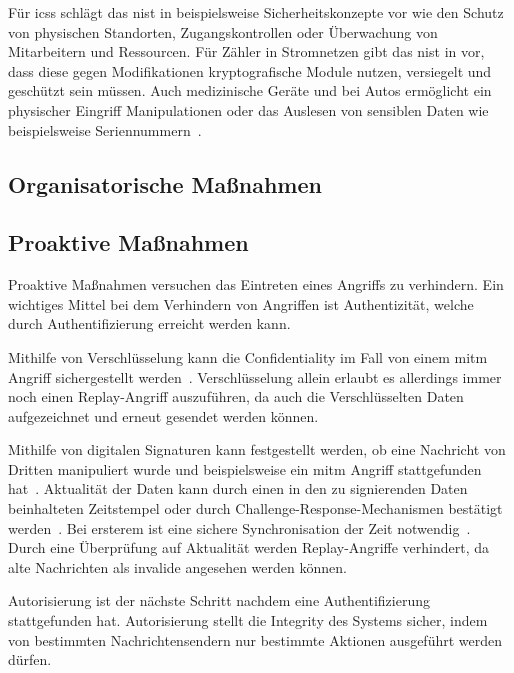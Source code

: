 \documentclass[final,bibliography=totocnumbered]{include/sikseminar}
\begin{document}
Für \glspl{ics} schlägt das \gls{nist} in \cite{HUM 153} beispielsweise Sicherheitskonzepte vor wie den Schutz von physischen Standorten, Zugangskontrollen oder Überwachung von Mitarbeitern und Ressourcen.
Für Zähler in Stromnetzen gibt das \gls{nist} in \cite{HUM 127} vor, dass diese gegen Modifikationen kryptografische Module nutzen, versiegelt und geschützt sein müssen.
Auch medizinische Geräte und bei Autos ermöglicht ein physischer Eingriff Manipulationen oder das Auslesen von sensiblen Daten wie beispielsweise Seriennummern~\cite{HLL+17}.


\subsection{Organisatorische Maßnahmen}\label{subsec:orga}

\subsection{Proaktive Maßnahmen}\label{subsec:proactive}
Proaktive Maßnahmen versuchen das Eintreten eines Angriffs zu verhindern.
Ein wichtiges Mittel bei dem Verhindern von Angriffen ist Authentizität, welche durch Authentifizierung erreicht werden kann.

Mithilfe von Verschlüsselung kann die Confidentiality im Fall von einem \gls{mitm} Angriff sichergestellt werden~\cite{HLL+17}.
Verschlüsselung allein erlaubt es allerdings immer noch einen Replay-Angriff auszuführen, da auch die Verschlüsselten Daten aufgezeichnet und erneut gesendet werden können.

Mithilfe von digitalen Signaturen kann festgestellt werden, ob eine Nachricht von Dritten manipuliert wurde und beispielsweise ein \gls{mitm} Angriff stattgefunden hat~\cite{CAS08}.
Aktualität der Daten kann durch einen in den zu signierenden Daten beinhalteten Zeitstempel oder durch Challenge-Response-Mechanismen bestätigt werden~\cite{CAS08}.
Bei ersterem ist eine sichere Synchronisation der Zeit notwendig~\cite{CAS08}.
Durch eine Überprüfung auf Aktualität werden Replay-Angriffe verhindert, da alte Nachrichten als invalide angesehen werden können.

Autorisierung ist der nächste Schritt nachdem eine Authentifizierung stattgefunden hat.
Autorisierung stellt die Integrity des Systems sicher, indem von bestimmten Nachrichtensendern nur bestimmte Aktionen ausgeführt werden dürfen.
\end{document}
